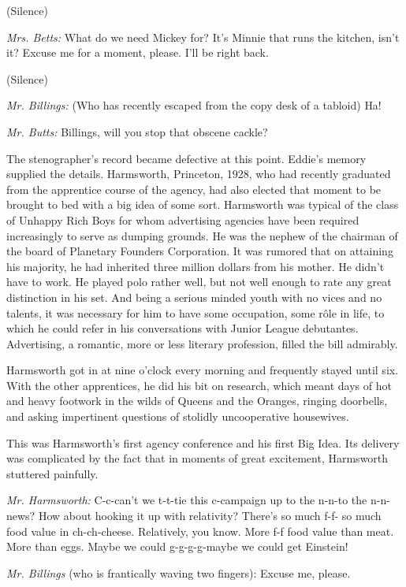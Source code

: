 \documentclass[twoside,nohyper,openany,nobib]{tufte-book}
\begin{document}
(Silence)

\emph{Mrs. Betts:} What do we need Mickey for? It's Minnie that runs the
kitchen, isn't it? Excuse me for a moment, please. I'll be right back.

(Silence)

\emph{Mr. Billings:} (Who has recently escaped from the copy desk of a
tabloid) Ha!

\emph{Mr. Butts:} Billings, will you stop that obscene cackle?

The stenographer's record became defective at this point. Eddie's memory
supplied the details. Harmsworth, Princeton, 1928, who had recently
graduated from the apprentice course of the agency, had also elected
that moment to be brought to bed with a big idea of some sort.
Harmsworth was typical of the class of Unhappy Rich Boys for whom
advertising agencies have been required increasingly to serve as dumping
grounds. He was the nephew of the chairman of the board of Planetary
Founders Corporation. It was rumored that on attaining his majority, he
had inherited three million dollars from his mother. He didn't have to
work. He played polo rather well, but not well enough to rate any great
distinction in his set. And being a serious minded youth with no vices
and no talents, it was necessary for him to have some occupation, some
r\^{o}le in life, to which he could refer in his conversations with Junior
League debutantes. Advertising, a romantic, more or less literary
profession, filled the bill admirably.

Harmsworth got in at nine o'clock every morning and frequently stayed
until six. With the other apprentices, he did his bit on research, which
meant days of hot and heavy footwork in the wilds of Queens and the
Oranges, ringing doorbells, and asking impertinent questions of stolidly
uncooperative housewives.

This was Harmsworth's first agency conference and his first Big Idea.
Its delivery was complicated by the fact that in moments of great
excitement, Harmsworth stuttered painfully.

\emph{Mr. Harmsworth:} C-c-can't we t-t-tie this c-campaign up to the
n-n-to the n-n-news? How about hooking it up with relativity? There's so
much f-f- so much food value in ch-ch-cheese. Relatively, you know. More
f-f food value than meat. More than eggs. Maybe we could g-g-g-g-maybe
we could get Einstein!

\emph{Mr. Billings} (who is frantically waving two fingers): Excuse me,
please.
\end{document}
